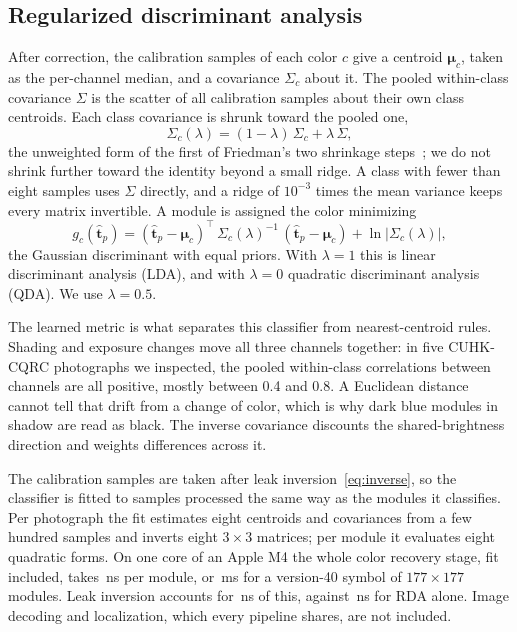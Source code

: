 \subsection{Regularized discriminant analysis}

After correction, the calibration samples of each color $c$ give a centroid
$\boldsymbol{\mu}_c$, taken as the per-channel median, and a covariance $\Sigma_c$ about
it. The pooled within-class covariance $\Sigma$ is the scatter of all calibration samples
about their own class centroids. Each class covariance is shrunk toward the pooled one,
\begin{equation}
\Sigma_c(\lambda) = (1-\lambda)\,\Sigma_c + \lambda\,\Sigma ,
\end{equation}
the unweighted form of the first of Friedman's two shrinkage steps~\cite{friedman1989rda};
we do not shrink further toward the identity beyond a small ridge. A class
with fewer than eight samples uses $\Sigma$ directly, and a ridge of $10^{-3}$ times the
mean variance keeps every matrix invertible. A module is assigned the color minimizing
\begin{equation}
g_c(\hat{\mathbf{t}}_p) = (\hat{\mathbf{t}}_p - \boldsymbol{\mu}_c)^{\top}\,
\Sigma_c(\lambda)^{-1}\,(\hat{\mathbf{t}}_p - \boldsymbol{\mu}_c) + \ln\left|\Sigma_c(\lambda)\right| ,
\end{equation}
the Gaussian discriminant with equal priors. With $\lambda = 1$ this is linear
discriminant analysis (LDA), and with $\lambda = 0$ quadratic discriminant analysis (QDA).
We use $\lambda = 0.5$.

The learned metric is what separates this classifier from nearest-centroid rules. Shading
and exposure changes move all three channels together: in five CUHK-CQRC photographs we
inspected, the pooled within-class correlations between channels are all positive, mostly
between 0.4 and 0.8. A Euclidean distance cannot tell that drift from a change of color,
which is why dark blue modules in shadow are read as black. The inverse covariance
discounts the shared-brightness direction and weights differences across it.

The calibration samples are taken after leak inversion~\eqref{eq:inverse}, so the
classifier is fitted to samples processed the same way as the modules it classifies. Per photograph the fit estimates eight
centroids and covariances from a few hundred samples and inverts eight $3\times 3$
matrices; per module it evaluates eight quadratic forms. On one core of an Apple M4 the
whole color recovery stage, fit included, takes \TimeChosenNs{}\,ns
per module, or \TimeChosenVforty{}\,ms for a version-40 symbol of $177\times 177$ modules.
Leak inversion accounts for \TimeDeblurNs{}\,ns of this, against \TimeRdaNs{}\,ns for RDA alone.
Image decoding and localization, which every pipeline shares, are not included.
